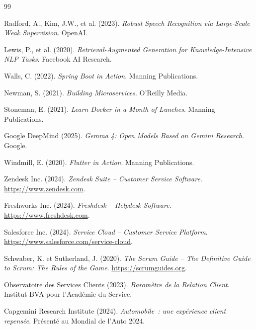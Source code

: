 \documentclass[a4paper,12pt]{report}
\begin{document}
\begin{thebibliography}{99}

 Radford, A., Kim, J.W., et al. (2023). \textit{Robust Speech Recognition via Large-Scale Weak Supervision}. OpenAI.

 Lewis, P., et al. (2020). \textit{Retrieval-Augmented Generation for Knowledge-Intensive NLP Tasks}. Facebook AI Research.

 Walls, C. (2022). \textit{Spring Boot in Action}. Manning Publications.

 Newman, S. (2021). \textit{Building Microservices}. O'Reilly Media.

 Stoneman, E. (2021). \textit{Learn Docker in a Month of Lunches}. Manning Publications.

 Google DeepMind (2025). \textit{Gemma 4: Open Models Based on Gemini Research}. Google.

 Windmill, E. (2020). \textit{Flutter in Action}. Manning Publications.

 Zendesk Inc. (2024). \textit{Zendesk Suite -- Customer Service Software}. \url{https://www.zendesk.com}.

 Freshworks Inc. (2024). \textit{Freshdesk -- Helpdesk Software}. \url{https://www.freshdesk.com}.

 Salesforce Inc. (2024). \textit{Service Cloud -- Customer Service Platform}. \url{https://www.salesforce.com/service-cloud}.

 Schwaber, K. et Sutherland, J. (2020). \textit{The Scrum Guide -- The Definitive Guide to Scrum: The Rules of the Game}. \url{https://scrumguides.org}.

 Observatoire des Services Clients (2023). \textit{Barom\`{e}tre de la Relation Client}. Institut BVA pour l'Acad\'{e}mie du Service.

 Capgemini Research Institute (2024). \textit{Automobile~: une exp\'{e}rience client repens\'{e}e}. Pr\'{e}sent\'{e} au Mondial de l'Auto 2024.

\end{thebibliography}
\end{document}
